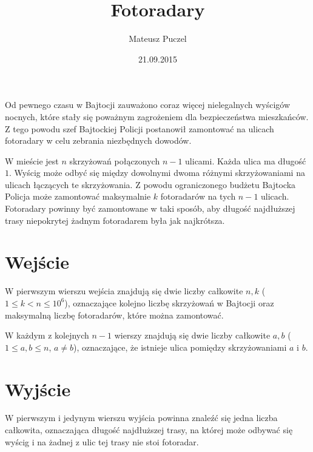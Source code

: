 \documentclass[zad,zawodnik,utf8]{sinol}
\title{Fotoradary}
\author{Mateusz Puczel}
\date{21.09.2015}
\begin{document}
  \begin{tasktext}%
Od pewnego czasu w Bajtocji zauważono coraz więcej nielegalnych wyścigów nocnych,
które stały się poważnym zagrożeniem dla bezpieczeństwa mieszkańców.
Z tego powodu szef Bajtockiej Policji postanowił zamontować na ulicach fotoradary w celu zebrania niezbędnych dowodów.
  
W mieście jest $n$ skrzyżowań połączonych $n - 1$ ulicami. Każda ulica ma długość $1$.
Wyścig może odbyć się między dowolnymi dwoma różnymi skrzyżowaniami na ulicach łączących te skrzyżowania.
Z powodu ograniczonego budżetu Bajtocka Policja może zamontować maksymalnie $k$ fotoradarów na tych $n - 1$ ulicach. 
Fotoradary powinny być zamontowane w taki sposób, aby długość najdłuższej trasy niepokrytej żadnym fotoradarem była jak najkrótsza.

  \section{Wejście}
W pierwszym wierszu wejścia znajdują się dwie liczby całkowite $n, k$ ($1 \leq k < n \leq 10^6$), 
oznaczające kolejno liczbę skrzyżowań w Bajtocji oraz maksymalną liczbę fotoradarów, które można zamontować.

W każdym z kolejnych $n - 1$ wierszy znajdują się dwie liczby całkowite $a, b$ ($1 \leq a, b \leq n$, $a \neq b$),
oznaczające, że istnieje ulica pomiędzy skrzyżowaniami $a$ i $b$.

  \section{Wyjście}
W pierwszym i jedynym wierszu wyjścia powinna znaleźć się jedna liczba całkowita, oznaczająca długość najdłuższej trasy, na której
może odbywać się wyścig i na żadnej z ulic tej trasy nie stoi fotoradar.
    
    \makecompactexample


  \end{tasktext}
\end{document}
